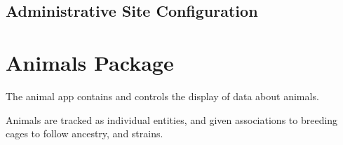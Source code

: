 \documentclass[letterpaper,10pt,english]{sphinxmanual}
\begin{document}

\begin{fulllineitems}
\label{api:data.views.experiment_detail}
\end{fulllineitems}


\begin{fulllineitems}
\label{api:data.views.experiment_detail_all}
\end{fulllineitems}


\begin{fulllineitems}
\label{api:data.views.experiment_list}
\end{fulllineitems}


\begin{fulllineitems}
\label{api:data.views.study_experiment}
\end{fulllineitems}

\label{api:module-data.urls}

\subsection{Administrative Site Configuration}
\label{api:administrative-site-configuration}\label{api:module-data.admin}

\section{Animals Package}
\label{api:animals-package}\label{api:module-animal}
The animal app contains and controls the display of data about animals.

Animals are tracked as individual entities, and given associations to breeding cages to follow ancestry, and strains.
\end{document}

